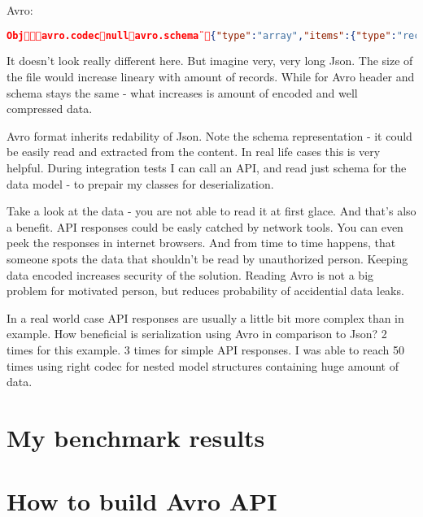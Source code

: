 \documentclass[]{article}
\begin{document}
Avro:
\begin{lstlisting}[language=json,firstnumber=1]
Objavro.codecnullavro.schema¨{"type":"array","items":{"type":"record","name":"Dataset","fields":[{"name":"minPosition","type":"int"},{"name":"hasMoreItems","type":"boolean"},{"name":"itemsHtml","type":["null","string"]},{"name":"newLatentCount","type":"int"},{"name":"itemIds","type":{"type":"array","items":"int"}},{"name":"isAvailable","type":"boolean"}]}} /Âźľ)|ř OČëHE řř\items_html6e64c2b9-dc87-4be3-b8ba-eca0da96ce78ŞÜVň  Ŕ\items_htmlaa233d3b-d6ea-41ff-b50f-f099c0c79991Ćx˛†   /Âźľ)|ř OČëHE
\end{lstlisting}

It doesn't look really different here. But imagine very, very long Json. The size of the file would increase lineary with amount of records. While for Avro header and schema stays the same - what increases is amount of encoded and well compressed data.

Avro format inherits redability of Json. Note the schema representation - it could be easily read and extracted from the content. In real life cases this is very helpful. During integration tests I can call an API, and read just schema for the data model - to prepair my classes for deserialization.

Take a look at the data - you are not able to read it at first glace. And that's also a benefit. API responses could be easly catched by network tools. You can even peek the responses in internet browsers. And from time to time happens, that someone spots the data that shouldn't be read by unauthorized person. Keeping data encoded increases security of the solution. Reading Avro is not a big problem for motivated person, but reduces probability of accidential data leaks.

In a real world case API responses are usually a little bit more complex than in example. How beneficial is serialization using Avro in comparison to Json? 2 times for this example. 3 times for simple API responses. I was able to reach 50 times using right codec for nested model structures containing huge amount of data.

\section{My benchmark results}



\section{How to build Avro API}
\end{document}
